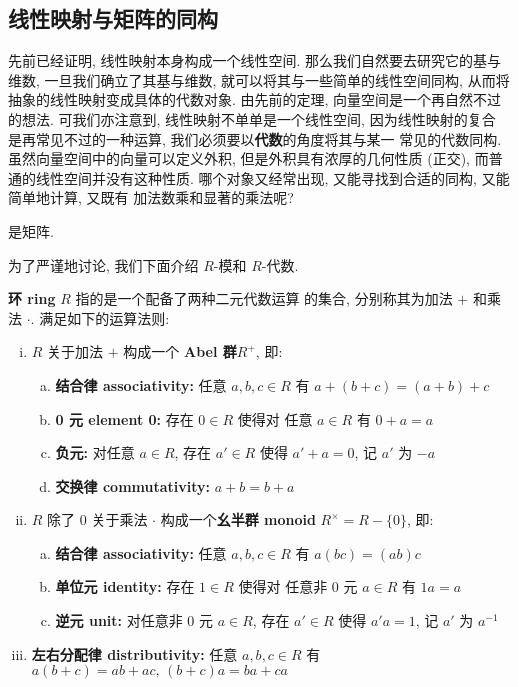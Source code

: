 \documentclass[UTF8]{book}
\begin{document}
\subsection{线性映射与矩阵的同构}

先前已经证明, 线性映射本身构成一个线性空间. 
那么我们自然要去研究它的基与维数, 
一旦我们确立了其基与维数, 就可以将其与一些简单的线性空间同构, 
从而将抽象的线性映射变成具体的代数对象. 
由先前的定理, 向量空间是一个再自然不过的想法. 
可我们亦注意到, 线性映射不单单是一个线性空间, 因为线性映射的复合
是再常见不过的一种运算, 我们必须要以\textbf{代数}的角度将其与某一
常见的代数同构. 虽然向量空间中的向量可以定义外积, 
但是外积具有浓厚的几何性质 (正交), 而普通的线性空间并没有这种性质. 
哪个对象又经常出现, 又能寻找到合适的同构, 又能简单地计算, 又既有
加法数乘和显著的乘法呢? 

是矩阵. 

为了严谨地讨论, 我们下面介绍 $R$-模和 $R$-代数. 

\begin{definition}
    \textbf{环 ring} $R$ 指的是一个配备了两种二元代数运算
    的集合, 分别称其为加法 $+$ 和乘法 $\cdot$. 满足如下的运算法则: 
    \begin{enumerate}[(i)]
        \item $R$ 关于加法 $+$ 构成一个\textbf{ Abel 群}$R^{+}$, 即:
            \begin{enumerate}[(a)]
                \item \textbf{结合律 associativity:} 任意 $a,b,c \in R$ 有
                $a+(b+c) = (a+b)+c$
                \item \textbf{0 元 element 0:} 存在 $ 0 \in R$ 使得对
                任意 $a\in R$ 有 $ 0+a = a$
                \item \textbf{负元:} 对任意 $a\in R$, 存在 $a' \in R$ 
                使得 $a' + a = 0$, 记 $a'$ 为 $-a$
                \item \textbf{交换律 commutativity:} $ a+b =b+a$
            \end{enumerate}
            \item $R$ 除了 0 关于乘法 $\cdot$ 构成一个\textbf{幺半群 monoid}
             $ R^{\times} = R - \{0\} $, 即:
            \begin{enumerate}[(a)]
                \item \textbf{结合律 associativity:} 任意 $a,b,c \in R$ 有
                $a(bc) = (ab)c$
                \item \textbf{单位元 identity:} 存在 $ 1 \in R$ 使得对
                任意非 0 元 $a\in R$ 有 $ 1a = a$
                \item \textbf{逆元 unit:} 对任意非 0 元 $a\in R$, 存在 $a' \in R$ 
                使得 $a'a = 1$, 记 $a'$ 为 $a^{-1}$
            \end{enumerate}
        \item \textbf{左右分配律 distributivity:} 任意 $a,b,c \in R$ 有
        $ a(b+c) = ab + ac,\, (b+c)a = ba + ca$
    \end{enumerate}
\end{definition}
\end{document}

